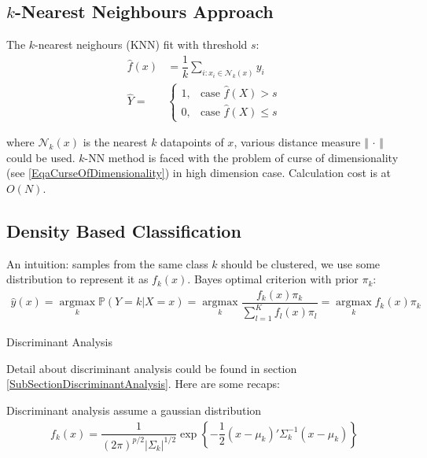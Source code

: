     

    

\subsection{$ k $-Nearest Neighbours Approach}
    The $ k $-nearest neighours (KNN) fit with threshold $ s $:
    \begin{align}
        \hat{f}(x)&=\dfrac{1}{k}\sum_{i:x_i\in\mathcal{N}_k(x)}y_i \\
        \hat{Y}=&\begin{cases}
            1,&\text{case }\hat{f}(X)>s\\
            0,&\text{case }\hat{f}(X)\leq s
        \end{cases}
    \end{align}

    where $ \mathcal{N}_k(x) $ is the nearest $ k $ datapoints of $ x $, various distance measure $ \left\Vert \,\cdot\, \right\Vert  $ could be used. $ k $-NN method is faced with the problem of curse of dimensionality (see \autoref{EqaCurseOfDimensionality}) in high dimension case. Calculation cost is at $ O(N) $.

\subsection{Density Based Classification}

    An intuition: samples from the same class $ k $ should be clustered, we use some distribution to represent it as $ f_k(x) $. Bayes optimal criterion with prior $ \pi_k $:
    \begin{align}
        \hat{y}(x)=\mathop{\arg\max}\limits_{k} \mathbb{P}\left( Y=k|X=x \right)=\mathop{\arg\max}\limits_{k}\dfrac{f_k(x)\pi_k}{\sum_{l=1}^Kf_l(x)\pi_l} =\mathop{\arg\max}\limits_{k} f_k(x)\pi_k
    \end{align}
    
\begin{point}
    Discriminant Analysis
\end{point}

    Detail about discriminant analysis could be found in section \autoref{SubSectionDiscriminantAnalysis}. Here are some recaps:

    Discriminant analysis assume a gaussian distribution
    \begin{align}
        f_k(x)=\dfrac{1}{(2\pi)^{p/2}|\Sigma _k|^{1/2}}\exp\left\{ -\dfrac{1}{2}(x-\mu _k)'\Sigma _k^{-1}(x-\mu _k) \right\}
    \end{align}    
    
